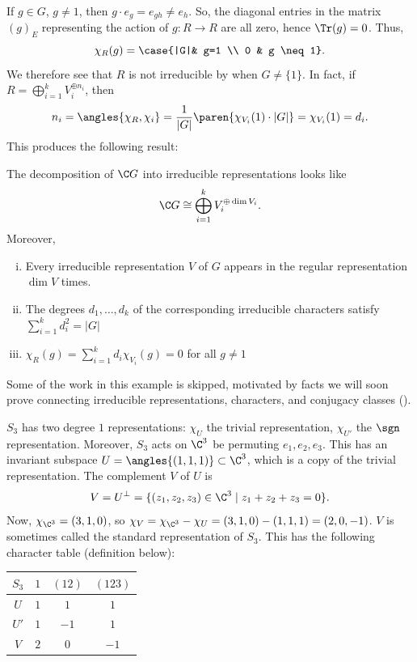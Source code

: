 If $g \in G$, $g \neq 1$, then $g \cdot e_g=e_{gh}\neq e_h$. So, the diagonal entries in the matrix $(g)_E$ representing the action of $g:R \to R$ are all zero, hence $\Tr (g)=0$. Thus,
$$\chi_R(g) = \case{|G|& g=1 \\ 0 & g \neq 1}.$$
We therefore see that $R$ is not irreducible by  when $G \neq \{1\}$. In fact, if $R = \bigoplus _{i=1}^kV_i^{\oplus n_i}$, then
$$n_i = \angles{\chi_R,\chi_i}=\frac{1}{|G|}\paren{\chi_{V_i}(1)\cdot |G|}=\chi_{V_i}(1)=d_i.$$
This produces the following result:
\begin{thm}[][label=thm:thm3]
    The decomposition of $\C G$ into irreducible representations looks like
    $$\C G \cong \bigoplus _{i=1}^kV_i^{\oplus \dim V_i}.$$
    Moreover,
    \begin{enumerate}[(i)]
        \item Every irreducible representation $V$ of $G$ appears in the regular representation $\dim V$ times.
        \item The degrees $d_1,\dots,d_k$ of the corresponding irreducible characters satisfy $\sum_{i=1}^kd_i^2 = |G|$
        \item $\chi _R(g)=\sum_{i=1}^kd_i\chi_{V_i}(g)=0$ for all $g \neq 1$
    \end{enumerate}
\end{thm}

\begin{ex}[Characters of $S_3$]
    Some of the work in this example is skipped, motivated by facts we will soon prove connecting irreducible representations, characters, and conjugacy classes ().

    $S_3$ has two degree $1$ representations: $\chi _U$ the trivial representation, $\chi_{U'}$ the $\sgn$ representation. Moreover, $S_3$ acts on $\C^3$ be permuting $e_1,e_2,e_3$. This has an invariant subspace $U=\angles{(1,1,1)} \subset \C^3$, which is a copy of the trivial representation. The complement $V$ of $U$ is
    $$V = U^\perp =\{ (z_1,z_2,z_3) \in \C^3\mid z_1+z_2+z_3=0\}.$$
    Now, $\chi_{\C^3}=(3,1,0)$, so $\chi _V = \chi_{\C ^3}-\chi _U = (3,1,0)-(1,1,1)=(2,0,-1)$. $V$ is sometimes called the standard representation of $S_3$. This has the following character table (definition below):

    \begin{tabular}{c|ccc}
            $S_3$ & $1$  & $(12)$ & $(123)$ \\ \hline
           $U$  & $1$ & $1$ & $1$ \\
            $U'$ & $1$ & $-1$  & $1$ \\
            $V$ & $2$ & $0$  & $-1$ \\
        \end{tabular}
\end{ex}

